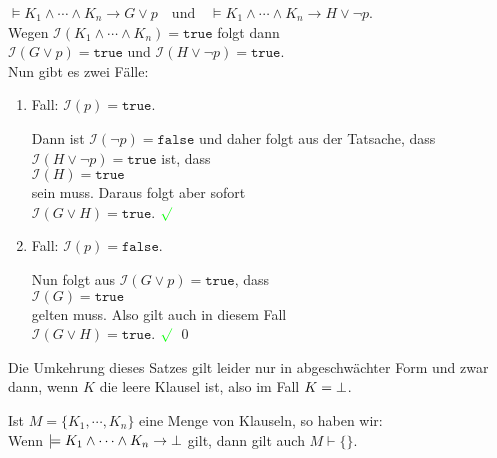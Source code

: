 \begin{enumerate}
      $\models K_1 \wedge \cdots \wedge K_n \rightarrow G \vee p \quad \mathrm{und} \quad 
         \models K_1 \wedge \cdots \wedge K_n \rightarrow H \vee \neg p
      $.
      \\[0.2cm]
      Wegen $\mathcal{I}(K_1 \wedge \cdots \wedge K_n) = \mathtt{true}$ folgt dann
      \\[0.2cm]
      \hspace*{1.3cm}
      $\mathcal{I}(G \vee p) = \mathtt{true}$ \quad und \quad $\mathcal{I}(H \vee \neg p) = \mathtt{true}$.
      \\[0.2cm]
      Nun gibt es zwei Fälle:
      \begin{enumerate}
      \item Fall: $\mathcal{I}(p) = \mathtt{true}$.

            Dann ist $\mathcal{I}(\neg p) = \mathtt{false}$ und daher folgt aus der Tatsache, dass 
            $\mathcal{I}(H \vee \neg p) = \mathtt{true}$ ist, dass
            \\[0.2cm]
            \hspace*{1.3cm}
            $\mathcal{I}(H) = \mathtt{true}$
            \\[0.2cm]
            sein muss.  Daraus folgt aber sofort
            \\[0.2cm]
            \hspace*{1.3cm}
            $\mathcal{I}(G \vee H) = \mathtt{true}$.  ${\color{green}\surd}$
      \item Fall: $\mathcal{I}(p) = \mathtt{false}$.

            Nun folgt aus $\mathcal{I}(G \vee p) = \mathtt{true}$, dass
            \\[0.2cm]
            \hspace*{1.3cm}
            $\mathcal{I}(G) = \mathtt{true}$
            \\[0.2cm]
            gelten muss.  Also gilt auch in diesem Fall
            \\[0.2cm]
            \hspace*{1.3cm}
            $\mathcal{I}(G \vee H) = \mathtt{true}$.  ${\color{green}\surd}$ 
            \qed
      \end{enumerate}
\end{enumerate}

\noindent
Die Umkehrung dieses Satzes gilt leider nur in abgeschwächter Form und zwar dann, wenn $K$
die leere Klausel ist, also im Fall $K = \bot$.
\begin{Satz} \label{widerlegungs-vollstaendig}
  Ist  $M = \{K_1, \cdots, K_n \}$ eine Menge von Klauseln,
  so haben wir: \\[0.1cm]
  \hspace*{1.3cm} 
  Wenn $\models K_1 \wedge \cdots \wedge K_n \rightarrow \bot$ gilt, dann gilt auch  $M \vdash \{\}$.
\end{Satz}

